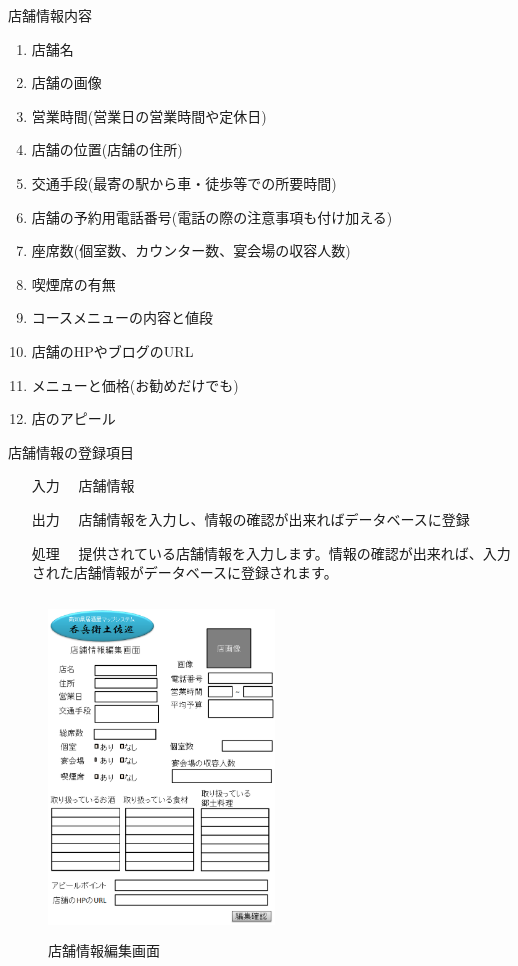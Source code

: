 \documentclass[a4j,titlepage]{jarticle}
\begin{document}
店舗情報内容
\begin{enumerate}
\item 店舗名
\item 店舗の画像
\item 営業時間(営業日の営業時間や定休日)
\item 店舗の位置(店舗の住所)
\item 交通手段(最寄の駅から車・徒歩等での所要時間)
\item 店舗の予約用電話番号(電話の際の注意事項も付け加える)
\item 座席数(個室数、カウンター数、宴会場の収容人数)
\item 喫煙席の有無
\item コースメニューの内容と値段
\item 店舗のHPやブログのURL
\item メニューと価格(お勧めだけでも)
\item 店のアピール
\end{enumerate}


店舗情報の登録項目
\begin{enumerate}
  \item [入力]　店舗情報
  \item [出力]　店舗情報を入力し、情報の確認が出来ればデータベースに登録
  \item [処理]　提供されている店舗情報を入力します。情報の確認が出来れば、入力された店舗情報がデータベースに登録されます。
\end{enumerate}

\begin{figure}[htbp]
  \begin{center}
  \includegraphics [height=9cm, width=6cm]{extrnal1_design_document_image/s6.eps}
  \caption{店舗情報編集画面}
  \label {fig:s6}
  \end{center}
\end{figure}
\end{document}
